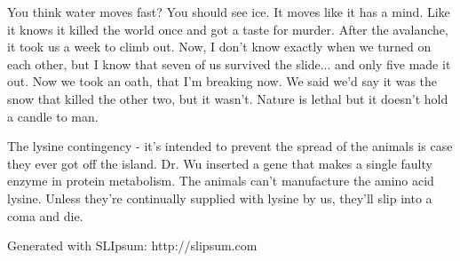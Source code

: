 \documentclass{cs19proc}
\begin{document}
You think water moves fast? You should see ice. It moves like it has a mind. Like it knows it killed the world once and got a taste for murder. After the avalanche, it took us a week to climb out. Now, I don't know exactly when we turned on each other, but I know that seven of us survived the slide... and only five made it out. Now we took an oath, that I'm breaking now. We said we'd say it was the snow that killed the other two, but it wasn't. Nature is lethal but it doesn't hold a candle to man.

The lysine contingency - it's intended to prevent the spread of the animals is case they ever got off the island. Dr. Wu inserted a gene that makes a single faulty enzyme in protein metabolism. The animals can't manufacture the amino acid lysine. Unless they're continually supplied with lysine by us, they'll slip into a coma and die.

Generated with SLIpsum: http://slipsum.com
\end{document}
